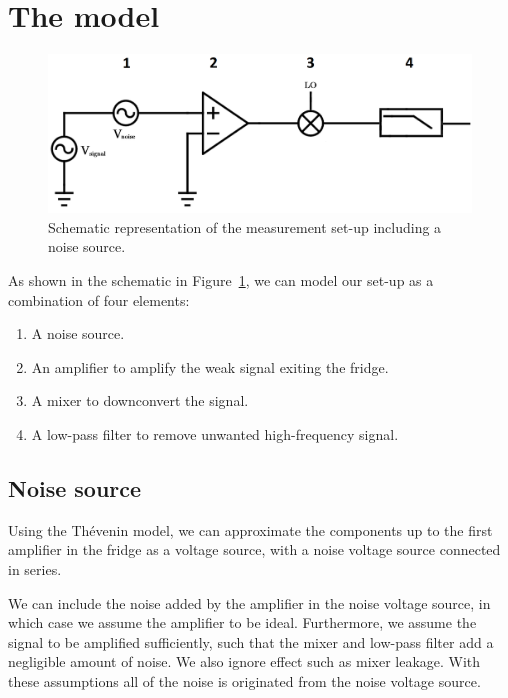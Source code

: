 \newpage
\section{The model}

\begin{figure}
    \centering
    \includegraphics[width=.8\textwidth]{Figures/Noise/Noise model.png}
    \caption{Schematic representation of the measurement set-up including a noise source.}
    \label{fig:noise model}
\end{figure}


As shown in the schematic in Figure~\ref{fig:noise model}, we can model our set-up as a combination of four elements:

\begin{enumerate}
    \item A noise source.
    \item An amplifier to amplify the weak signal exiting the fridge.
    \item A mixer to downconvert the signal.
    \item A low-pass filter to remove unwanted high-frequency signal.
\end{enumerate}



\subsection{Noise source}

Using the Th\'evenin model, we can approximate the components up to the first amplifier in the fridge as a voltage source, with a noise voltage source connected in series.

We can include the noise added by the amplifier in the noise voltage source, in which case we assume the amplifier to be ideal. Furthermore, we assume the signal to be amplified sufficiently, such that the mixer and low-pass filter add a negligible amount of noise. We also ignore effect such as mixer leakage. With these assumptions all of the noise is originated from the noise voltage source.

